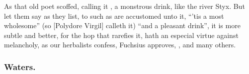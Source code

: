 
As that old poet scoffed, calling it , a monstrous drink, like the river Styx. But let them say as
they list, to such as are accustomed unto it, \enquote{'tis a most wholesome} (so
[Polydore Virgil] calleth it) \enquote{and
a pleasant drink}, it is more subtle and better, for the hop that rarefies it,
hath an especial virtue against melancholy, as our herbalists confess, Fuchsius
approves, , and many
others.

\subsubsection{Waters.}

